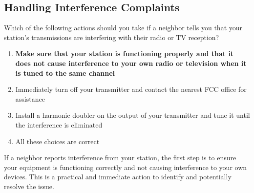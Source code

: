 \subsection{Handling Interference Complaints}
\label{T7B06}

\begin{tcolorbox}[colback=gray!10!white,colframe=black!75!black,title=T7B06]
Which of the following actions should you take if a neighbor tells you that your station’s transmissions are interfering with their radio or TV reception?
\begin{enumerate}[noitemsep]
    \item \textbf{Make sure that your station is functioning properly and that it does not cause interference to your own radio or television when it is tuned to the same channel}
    \item Immediately turn off your transmitter and contact the nearest FCC office for assistance
    \item Install a harmonic doubler on the output of your transmitter and tune it until the interference is eliminated
    \item All these choices are correct
\end{enumerate}
\end{tcolorbox}

If a neighbor reports interference from your station, the first step is to ensure your equipment is functioning correctly and not causing interference to your own devices. This is a practical and immediate action to identify and potentially resolve the issue.